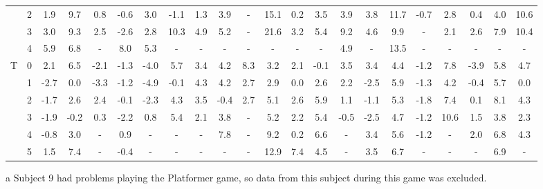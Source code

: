 \begin{landscape}
\begin{table*}
\begin{threeparttable}
{\begin{tabular}{cccccccccccccccccccccc}
                      & 2   & 1.9  & 9.7  & 0.8  & -0.6 & 3.0   & -1.1 & 1.3  & 3.9  & -\tnote{a}   & 15.1 & 0.2   & 3.5    & 3.9  & 3.8  & 11.7 & -0.7 & 2.8  & 0.4  & 4.0  & 10.6 \\
                      & 3   & 3.0  & 9.3  & 2.5  & -2.6 & 2.8   & 10.3 & 4.9  & 5.2  & -\tnote{a}   & 21.6 & 3.2   & 5.4    & 9.2  & 4.6  & 9.9  & -    & 2.1  & 2.6  & 7.9  & 10.4 \\
                      & 4   & 5.9  & 6.8  & -    & 8.0  & 5.3   & -    & -    & -    & -\tnote{a}   & -    & -     & -      & 4.9  & -    & 13.5 & -    & -    & -    & -    & -     \\
\hline
\multirow{6}{*}{T}    & 0   & 2.1  & 6.5  & -2.1 & -1.3 & -4.0  & 5.7  & 3.4  & 4.2  & 8.3  & 3.2  & 2.1   & -0.1  & 3.5  & 3.4  & 4.4  & -1.2 & 7.8  & -3.9 & 5.8  & 4.7  \\
                      & 1   & -2.7 & 0.0  & -3.3 & -1.2 & -4.9  & -0.1 & 4.3  & 4.2  & 2.7  & 2.9  & 0.0   & 2.6   & 2.2  & -2.5 & 5.9  & -1.3 & 4.2  & -0.4 & 5.7  & 0.0 \\
                      & 2   & -1.7 & 2.6  & 2.4  & -0.1 & -2.3  & 4.3  & 3.5  & -0.4 & 2.7  & 5.1  & 2.6   & 5.9   & 1.1  & -1.1 & 5.3  & -1.8 & 7.4  & 0.1  & 8.1  & 4.3  \\
                      & 3   & -1.9 & -0.2 & 0.3  & -2.2 & 0.8   & 5.4  & 2.1  & 3.8  & -    & 5.2  & 2.2   & 5.4   & -0.5 & -2.5 & 4.7  & -1.2 & 10.6 & 1.5  & 3.8  & 2.3  \\
                      & 4   & -0.8 & 3.0  & -    & 0.9  & -     & -    & -    & 7.8  & -    & 9.2  & 0.2   & 6.6   & -    & 3.4  & 5.6  & -1.2 & -    & 2.0  & 6.8  & 4.3  \\
                      & 5   & 1.5  & 7.4  & -    & -0.4 & -     & -    & -    & -    & -    & 12.9 & 7.4   & 4.5   & -    & 3.5  & 6.7  & -    & -    & -    & 6.9  & -    \\
\hline
\end{tabular}
}
\begin{tablenotes}
\small
\item[a]{Subject 9 had problems playing the Platformer game, so data from this subject during this game was excluded.}
\end{tablenotes}
\end{threeparttable}
\end{table*}
\end{landscape}

